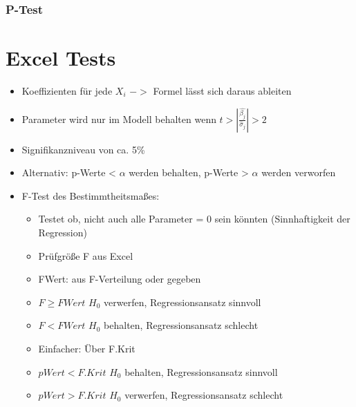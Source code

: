 \documentclass[a4paper]{article}
\begin{document}
\begin{landscape}
\begin{multicols}{4}
        \subsubsection*{P-Test}

    \section*{Excel Tests}
    \begin{itemize}[noitemsep,nolistsep,leftmargin=*]
        \item Koeffizienten für jede $X_i$ $->$ Formel lässt sich daraus ableiten
        \item Parameter wird nur im Modell behalten wenn $t > |\frac{\hat{\beta_j}}{\hat{\sigma}_j}| > 2$
        \item Signifikanzniveau von ca. 5\%
        \item Alternativ: p-Werte < $\alpha$ werden behalten, p-Werte > $\alpha$ werden verworfen
        \item F-Test des Bestimmtheitsmaßes:
        \begin{itemize}[noitemsep,nolistsep,leftmargin=*]
            \item Testet ob, nicht auch alle Parameter = 0 sein könnten (Sinnhaftigkeit der Regression)
            \item Prüfgröße F aus Excel
            \item FWert: aus F-Verteilung oder gegeben
            \item $F  \geq FWert$ $H_0$ verwerfen, Regressionsansatz sinnvoll
            \item $F < FWert$ $H_0$ behalten, Regressionsansatz schlecht
            \item Einfacher: Über  F.Krit
            \item $p Wert < F.Krit$ $H_0$ behalten, Regressionsansatz sinnvoll
            \item $p Wert > F.Krit$ $H_0$ verwerfen, Regressionsansatz schlecht
        \end{itemize}
    \end{itemize}


\end{multicols}
\end{landscape}
\end{document}
